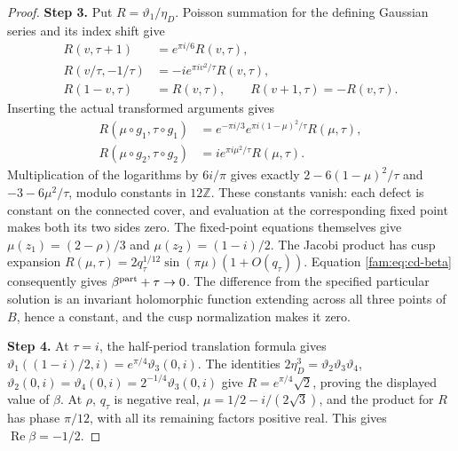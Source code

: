 \documentclass[11pt,a4paper]{article}
\theoremstyle{plain}
\theoremstyle{definition}
\begin{document}
\begin{proof}
\noindent\textbf{Step 3.} Put \(R=\vartheta_1/\eta_D\). Poisson summation for the defining Gaussian
series and its index shift give
\[
 \begin{aligned}
 R(v,\tau+1)&=e^{\pi i/6}R(v,\tau),\\
 R(v/\tau,-1/\tau)&=-i e^{\pi iv^2/\tau}R(v,\tau),\\
 R(1-v,\tau)&=R(v,\tau),\qquad R(v+1,\tau)=-R(v,\tau).
 \end{aligned}
\]
Inserting the actual transformed arguments gives
\[
 \begin{aligned}
 R(\mu\circ g_1,\tau\circ g_1)
 &=e^{-\pi i/3}e^{\pi i(1-\mu)^2/\tau}R(\mu,\tau),\\
 R(\mu\circ g_2,\tau\circ g_2)
 &=i e^{\pi i\mu^2/\tau}R(\mu,\tau).
 \end{aligned}
\]
Multiplication of the logarithms by \(6i/\pi\) gives exactly
\(2-6(1-\mu)^2/\tau\) and \(-3-6\mu^2/\tau\), modulo constants in
\(12\mathbb Z\). These constants vanish: each defect is constant on the
connected cover, and evaluation at the corresponding fixed point makes
both its two sides zero. The fixed-point equations themselves give
\(\mu(z_1)=(2-\rho)/3\) and \(\mu(z_2)=(1-i)/2\).
The Jacobi product has cusp expansion
\(R(\mu,\tau)=2q_\tau^{1/12}\sin(\pi\mu)(1+O(q_\tau))\).
Equation \eqref{fam:eq:cd-beta} consequently gives
\(\beta^{\rm part}+\tau\to0\). The difference from the specified particular
solution is an invariant holomorphic function extending across all three
points of \(B\), hence a constant, and the cusp normalization makes it zero.


\noindent\textbf{Step 4.} At \(\tau=i\), the half-period translation formula gives
\(\vartheta_1((1-i)/2,i)=e^{\pi/4}\vartheta_3(0,i)\).
The identities \(2\eta_D^3=\vartheta_2\vartheta_3\vartheta_4\),
\(\vartheta_2(0,i)=\vartheta_4(0,i)=2^{-1/4}\vartheta_3(0,i)\)
give \(R=e^{\pi/4}\sqrt2\), proving the displayed value of \(\beta\).
At \(\rho\), \(q_\tau\) is negative real, \(\mu=1/2-i/(2\sqrt3)\), and the
product for \(R\) has phase \(\pi/12\), with all its remaining factors
positive real. This gives \(\operatorname{Re}\beta=-1/2\).
\end{proof}
\end{document}
